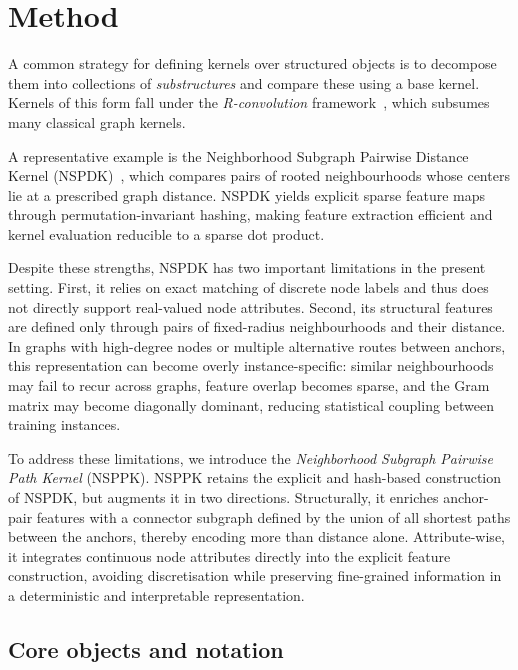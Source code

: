 \section{Method}
\label{sec:method}

  A common strategy for defining kernels over structured objects is to decompose
them into collections of \emph{substructures} and compare these using a base
kernel. Kernels of this form fall under the \emph{R-convolution}
framework~\citep{haussler1999}, which subsumes many classical graph kernels.

A representative example is the Neighborhood Subgraph Pairwise Distance Kernel
(NSPDK)~\citep{costa2010fast}, which compares pairs of rooted neighbourhoods
whose centers lie at a prescribed graph distance. NSPDK yields explicit sparse
feature maps through permutation-invariant hashing, making feature extraction
efficient and kernel evaluation reducible to a sparse dot product.

Despite these strengths, NSPDK has two important limitations in the present
setting. First, it relies on exact matching of discrete node labels and thus
does not directly support real-valued node attributes. Second, its structural
features are defined only through pairs of fixed-radius neighbourhoods and their
distance. In graphs with high-degree nodes or multiple alternative routes
between anchors, this representation can become overly instance-specific:
similar neighbourhoods may fail to recur across graphs, feature overlap becomes
sparse, and the Gram matrix may become diagonally dominant, reducing
statistical coupling between training instances.

To address these limitations, we introduce the
\emph{Neighborhood Subgraph Pairwise Path Kernel} (NSPPK). NSPPK retains the
explicit and hash-based construction of NSPDK, but augments it in two
directions. Structurally, it enriches anchor-pair features with a connector
subgraph defined by the union of all shortest paths between the anchors,
thereby encoding more than distance alone. Attribute-wise, it integrates
continuous node attributes directly into the explicit feature construction,
avoiding discretisation while preserving fine-grained information in a
deterministic and interpretable representation.

\subsection{Core objects and notation}
\label{sec:notation}

